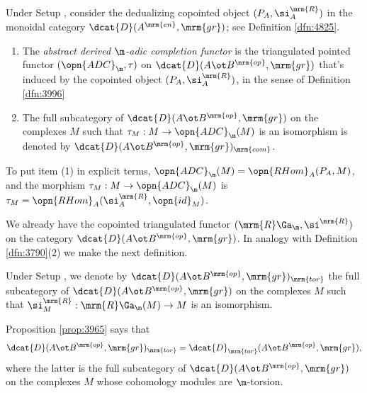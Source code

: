 \begin{dfn} \label{dfn:3790}
Under Setup \tup{\ref{setup:3900}}, consider the dedualizing copointed object 
$(P_A, \si^{\mrm{R}}_{A})$ in the monoidal category 
$\dcat{D}(A^{\mrm{en}}, \mrm{gr})$; see Definition \ref{dfn:4825}.
\begin{enumerate}
\item The {\em abstract derived $\m$-adic completion functor}%
%
is the triangulated \lb pointed functor $(\opn{ADC}_{\m}, \tau)$ 
on $\dcat{D}(A \ot B^{\mrm{op}}, \mrm{gr})$ 
that's induced by the copointed object 
$(P_A, \si^{\mrm{R}}_{A})$, in the sense of Definition \ref{dfn:3996}

\item The full subcategory of $\dcat{D}(A \ot B^{\mrm{op}}, \mrm{gr})$ on the 
complexes $M$ such that 
$\tau_{M} : M \to \opn{ADC}_{\m}(M)$
is an isomorphism is denoted by 
$\dcat{D}(A \ot B^{\mrm{op}}, \mrm{gr})_{\mrm{com}}$.
\end{enumerate}
\end{dfn}

To put item (1) in explicit terms,  
$\opn{ADC}_{\m}(M) = \opn{RHom}_A(P_A, M)$,
and the morphism 
$\tau_M : M \to \opn{ADC}_{\m}(M)$ is 
$\tau_M = \opn{RHom}_A(\si^{\mrm{R}}_{A}, \opn{id}_M)$. 

We already have the copointed triangulated functor 
$(\mrm{R} \Ga_{\m}, \si^{\mrm{R}})$ on the category 
$\dcat{D}(A \ot B^{\mrm{op}}, \mrm{gr})$. 
In analogy with Definition \ref{dfn:3790}(2) we make the next definition. 

\begin{dfn} \label{dfn:4020}
Under Setup \tup{\ref{setup:3900}}, we denote by 
$\dcat{D}(A \ot B^{\mrm{op}}, \mrm{gr})_{\mrm{tor}}$
the full subcategory of $\dcat{D}(A \ot B^{\mrm{op}}, \mrm{gr})$ on the 
complexes $M$ such that
$\si^{\mrm{R}}_{M} : \mrm{R} \Ga_{\m}(M) \to M$ 
is an isomorphism.
\end{dfn}

Proposition \ref{prop:3965} says that 
\[ \dcat{D}(A \ot B^{\mrm{op}}, \mrm{gr})_{\mrm{tor}} = 
\dcat{D}_{\mrm{tor}}(A \ot B^{\mrm{op}}, \mrm{gr}) , \]
where the latter is the full subcategory of 
$\dcat{D}(A \ot B^{\mrm{op}}, \mrm{gr})$ on the complexes $M$ whose cohomology 
modules are $\m$-torsion. 

